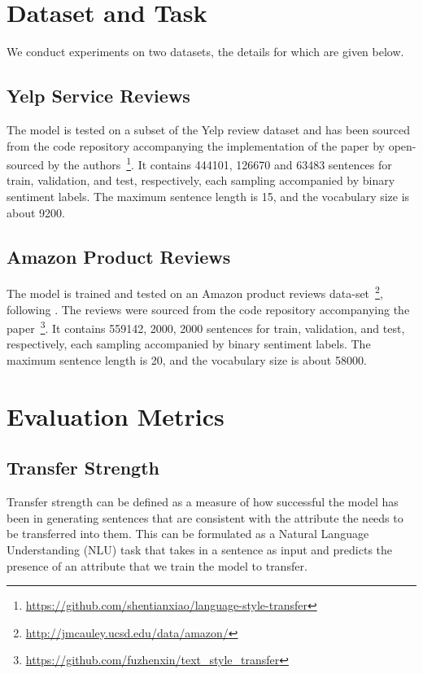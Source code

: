 \section{Dataset and Task}

We conduct experiments on two datasets, the details for which are given below.

\subsection{Yelp Service Reviews}

The model is tested on a subset of the Yelp review dataset \citep{challenge2013yelp} and has been sourced from the code repository accompanying the implementation of the paper by \cite{shen2017style} open-sourced by the authors~\footnote{\url{https://github.com/shentianxiao/language-style-transfer}}. It contains 444101, 126670 and 63483 sentences for train, validation, and test, respectively, each sampling accompanied by binary sentiment labels. The maximum sentence length is 15, and the vocabulary size is about 9200.

\subsection{Amazon Product Reviews}

The model is trained and tested on an Amazon product reviews data-set~\footnote{\url{http://jmcauley.ucsd.edu/data/amazon/}}, following \cite{fu2017style}. The reviews were sourced from the code repository accompanying the paper~\footnote{\url{https://github.com/fuzhenxin/text_style_transfer}}. It contains 559142, 2000, 2000 sentences for train, validation, and test, respectively, each sampling accompanied by binary sentiment labels. The maximum sentence length is 20, and the vocabulary size is about 58000.


\section{Evaluation Metrics} \label{sec:evaluation-metrics}

\subsection{Transfer Strength}

Transfer strength can be defined as a measure of how successful the model has been in generating sentences that are consistent with the attribute the needs to be transferred into them. This can be formulated as a Natural Language Understanding (NLU) task that takes in a sentence as input and predicts the presence of an attribute that we train the model to transfer.

